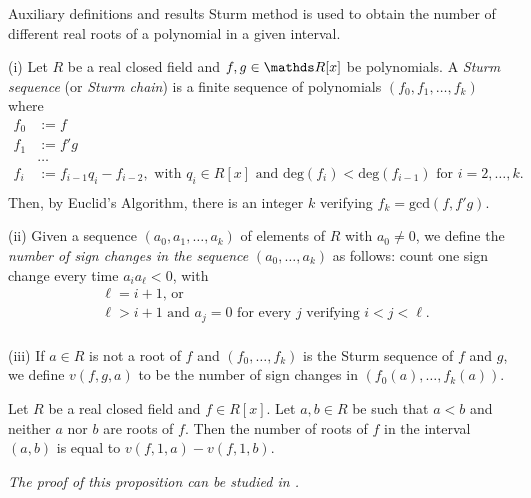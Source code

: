 \documentclass[11pt, a4paper, english, twoside, notitlepage, openright]{report}
\begin{document}
\begin{chapter}{Auxiliary definitions and results}
Sturm method is used to obtain the number of different real roots of a polynomial in a given interval.

\begin{definitions}\label{sturmSeq} (i) Let $R$ be a real closed field and $f,g\in\R[x]$ be polynomials. A  \emph{Sturm sequence} (or \emph{Sturm chain}) is a finite sequence of polynomials $(f_0, f_1, \dots, f_k)$ where 
\begin{equation*}
\begin{aligned}
f_0 &:= f\\
f_1 &:= f'g\\
& \dots\\
f_i &:= f_{i-1}q_i - f_{i-2}, \text{ with } q_{i}\in R[x] \text{ and } \text{deg}(f_{i}) < \text{deg}(f_{i-1}) \text{ for } i = 2, \dots, k.\\
\end{aligned}
\end{equation*}
	Then, by Euclid's Algorithm, there is an integer $k$ verifying $f_k = \text{gcd}(f, f'g)$.
	
(ii) Given a sequence $(a_0, a_1, \dots, a_k)$ of elements of $R$ with $a_0 \ne 0$, we define the \emph{number of sign changes in the sequence} $(a_0, \dots, a_k)$ as follows: count one sign change every time $a_ia_{\ell} < 0$, with 
\begin{equation*}
\begin{aligned}
&\ell = i + 1 \text{, or }\\
&\ell > i + 1 \text{ and } a_j = 0 \text{ for every } j \text{ verifying  } i < j < \ell.\\ 
\end{aligned}
\end{equation*}

(iii) If $a \in R$ is not a root of $f$ and $(f_0, \dots, f_k)$ is the Sturm sequence of $f$ and $g$, we define $v(f, g, a)$ to be the number of sign changes in $(f_0(a), \dots, f_k(a))$.
\end{definitions}
\begin{proposition}\label{sturm} 
Let $R$ be a real closed field and $f \in R[x]$. Let $a, b \in R$ be such that $a < b$ and neither $a$ nor $b$ are roots of $f$. Then the number of roots of $f$ in the interval $(a, b)$ is equal to $v(f, 1, a) - v(f, 1, b)$.

\em The proof of this proposition can be studied in \cite[1.2.10]{bcr}. \em
\end{proposition}


\end{chapter}
\end{document}

